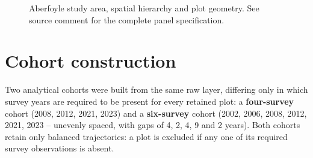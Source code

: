 \begin{figure}[!htbp]
\centering
{}
\caption{Aberfoyle study area, spatial hierarchy and plot geometry. See source comment for the
complete panel specification.}
\label{fig:data-study-area}
\end{figure}


\section{Cohort construction}
\label{sec:data-cohorts}

Two analytical cohorts were built from the same raw layer, differing only in which survey years
are required to be present for every retained plot: a \textbf{four-survey} cohort (2008, 2012,
2021, 2023) and a \textbf{six-survey} cohort (2002, 2006, 2008, 2012, 2021, 2023 -- unevenly
spaced, with gaps of 4, 2, 4, 9 and 2 years). Both cohorts retain only balanced trajectories: a
plot is excluded if any one of its required survey observations is absent.


